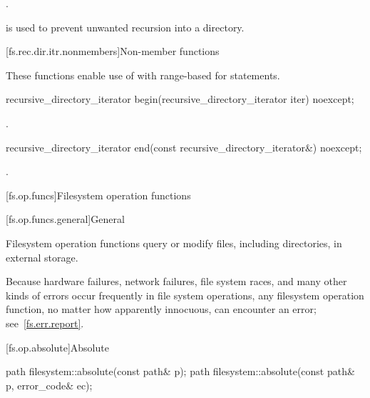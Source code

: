 \begin{itemdescr}
\pnum
\ensures
{}.

\pnum
\begin{note}
\tcode{()} is used to prevent
  unwanted recursion into a directory.
\end{note}
\end{itemdescr}

[fs.rec.dir.itr.nonmembers]{Non-member functions}

\pnum
These functions enable use of 
with range-based for statements.

%
\begin{itemdecl}
recursive_directory_iterator begin(recursive_directory_iterator iter) noexcept;
\end{itemdecl}

\begin{itemdescr}
\pnum
\returns
{}.
\end{itemdescr}

%
\begin{itemdecl}
recursive_directory_iterator end(const recursive_directory_iterator&) noexcept;
\end{itemdecl}

\begin{itemdescr}
\pnum
\returns
{}.
\end{itemdescr}

[fs.op.funcs]{Filesystem operation functions}

[fs.op.funcs.general]{General}

\pnum
Filesystem operation functions query or modify files, including directories,
in external storage.

\pnum
\begin{note}
Because hardware failures, network failures, file system races,
and many other kinds of errors occur frequently in file system operations,
any filesystem operation function, no matter how apparently innocuous,
can encounter an error; see~\ref{fs.err.report}.
\end{note}

[fs.op.absolute]{Absolute}

%
\begin{itemdecl}
path filesystem::absolute(const path& p);
path filesystem::absolute(const path& p, error_code& ec);
\end{itemdecl}

